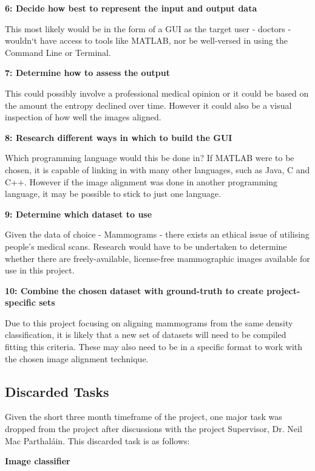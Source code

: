 \noindent \textbf{6: Decide how best to represent the input and output data}

This most likely would be in the form of a \acrshort{GUI} as the target user - doctors - wouldn`t have access to tools like MATLAB, nor be well-versed in using the Command Line or Terminal.

\noindent \textbf{7: Determine how to assess the output}

This could possibly involve a professional medical opinion or it could be based on the amount the entropy declined over time. However it could also be a visual inspection of how well the images aligned.

\noindent \textbf{8: Research different ways in which to build the \acrshort{GUI}}

Which programming language would this be done in? If MATLAB were to be chosen, it is capable of linking in with many other languages, such as Java, C and C++. However if the image alignment was done in another programming language, it may be possible to stick to just one language.

\vspace{2cm}
\noindent \textbf{9: Determine which dataset to use}

Given the data of choice - Mammograms - there exists an ethical issue of utilising people's medical scans. Research would have to be undertaken to determine whether there are freely-available, license-free mammographic images available for use in this project.

\noindent \textbf{10: Combine the chosen dataset with ground-truth to create project-specific sets}

Due to this project focusing on aligning mammograms from the same density classification, it is likely that a new set of datasets will need to be compiled fitting this criteria. These may also need to be in a specific format to work with the chosen image alignment technique.

\subsection{Discarded Tasks}

Given the short three month timeframe of the project, one major task was dropped from the project after discussions with the project Supervisor, Dr. Neil Mac Parthal\'ain. This discarded task is as follows:

\noindent \textbf{Image classifier}

